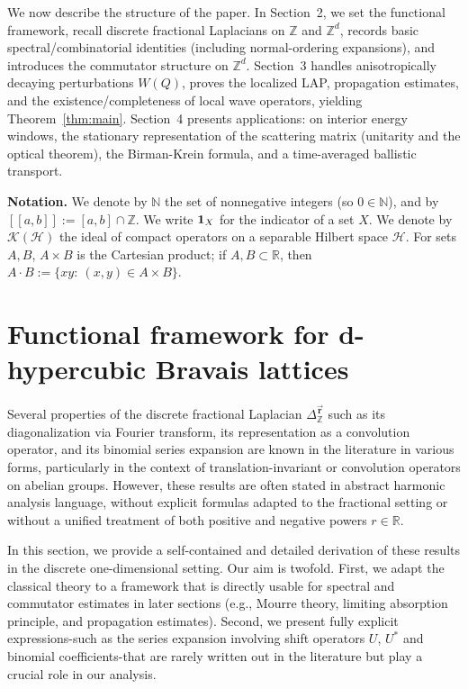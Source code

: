 \documentclass[10pt]{amsart} %
\newcommand{\R}{{\mathbb{R}}}
\newcommand{\Z}{{\mathbb{Z}}}
\newcommand{\N}{{\mathbb{N}}}
\newcommand{\1}{{\mathbb{I}}}
\newcommand{\Hc}{\mathcal{H}}
\newcommand{\Kc}{\mathcal{K}}
\newcommand{\un}{{\rm \bf {1}}}
\numberwithin{equation}{section}
\def \lint{[\![}
\def \rint{]\!]}
\begin{document}
\medskip
We now describe the structure of the paper.
 In Section~2, we set the functional framework, recall discrete fractional Laplacians on $\Z$ and $\Z^d$,
records basic spectral/combinatorial identities (including normal-ordering expansions),
and introduces the commutator structure on $\Z^d$.
Section~3 handles anisotropically decaying perturbations $W(Q)$, proves the localized LAP,
propagation estimates, and the existence/completeness of local wave operators, yielding
Theorem~\ref{thm:main}. Section~4 presents applications: on interior energy windows, the stationary
representation of the scattering matrix (unitarity and the optical theorem), the Birman-Krein formula,
and a time-averaged ballistic transport.

\noindent\textbf{Notation.}
We denote by $\N$ the set of nonnegative integers (so $0\in\N$), and by $\lint a,b\rint:=[a,b]\cap\Z$.
We write $\un_X$ for the indicator of a set $X$. We denote by $\Kc(\Hc)$ the ideal of compact operators
on a separable Hilbert space $\Hc$. For sets $A,B$, $A\times B$ is the Cartesian product; if $A,B\subset\R$,
then $A\cdot B:=\{xy:\ (x,y)\in A\times B\}$.

\section{Functional framework for d-hypercubic Bravais lattices}
Several properties of the discrete fractional Laplacian $\Delta_{\mathbb{Z}}^{\vec{\mathbf{r}}}$ such as its diagonalization via Fourier transform, its representation as a convolution operator, and its binomial series expansion are known in the literature in various forms, particularly in the context of translation-invariant or convolution operators on abelian groups. However, these results are often stated in abstract harmonic analysis language, without explicit formulas adapted to the fractional setting or without a unified treatment of both positive and negative powers $r \in \mathbb{R}$.

In this section, we provide a self-contained and detailed derivation of these results in the discrete one-dimensional setting. Our aim is twofold. First, we adapt the classical theory to a framework that is directly usable for spectral and commutator estimates in later sections (e.g., Mourre theory, limiting absorption principle, and propagation estimates). Second, we present fully explicit expressions-such as the series expansion involving shift operators $U$, $U^*$ and binomial coefficients-that are rarely written out in the literature but play a crucial role in our analysis.
\end{document}
